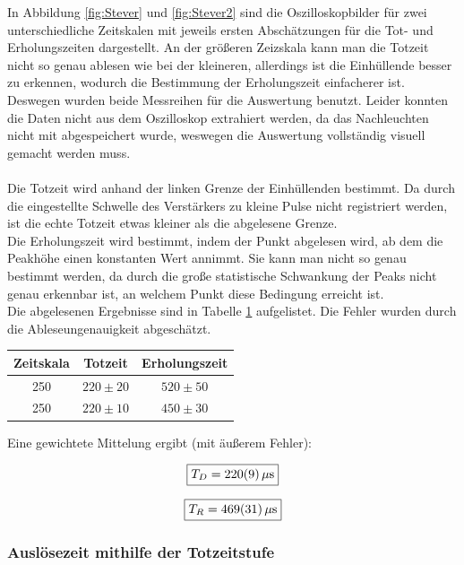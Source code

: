 \documentclass[12pt,a4paper]{article}
\begin{document}
In Abbildung \ref{fig:Stever} und \ref{fig:Stever2} sind die Oszilloskopbilder für zwei unterschiedliche Zeitskalen mit jeweils ersten Abschätzungen für die Tot- und Erholungszeiten dargestellt. An der größeren Zeizskala kann man die Totzeit nicht so genau ablesen wie bei der kleineren, allerdings ist die Einhüllende besser zu erkennen, wodurch die Bestimmung der Erholungszeit einfacherer ist. Deswegen wurden beide Messreihen für die Auswertung benutzt.
Leider konnten die Daten nicht aus dem Oszilloskop extrahiert werden, da das Nachleuchten nicht mit abgespeichert wurde, weswegen die Auswertung vollständig visuell gemacht werden muss.\\
\\
Die Totzeit wird anhand der linken Grenze der Einhüllenden bestimmt. Da durch die eingestellte Schwelle des Verstärkers zu kleine Pulse nicht registriert werden, ist die echte Totzeit etwas kleiner als die abgelesene Grenze.\\
Die Erholungszeit wird bestimmt, indem der Punkt abgelesen wird, ab dem die Peakhöhe einen konstanten Wert annimmt.
Sie kann man nicht so genau bestimmt werden, da durch die große statistische Schwankung der Peaks nicht genau erkennbar ist, an welchem Punkt diese Bedingung erreicht ist.\\
Die abgelesenen Ergebnisse sind in Tabelle \ref{teb:Stever} aufgelistet. Die Fehler wurden durch die Ableseungenauigkeit abgeschätzt.

\begin{table}
\centering
\begin{tabular}{|c|c|c|}
\hline
Zeitskala & Totzeit & Erholungszeit\\
\hline 
250 & $220\pm 20$ & $520\pm 50$ \\
\hline 
250 & $220\pm 10$ & $450\pm 30$ \\
\hline
\end{tabular}
\label{teb:Stever}
\end{table}

Eine gewichtete Mittelung ergibt (mit äußerem Fehler):

\begin{equation}
\boxed{T_D = \SI{220 \pm 9}{\mu s}}
\end{equation}

\begin{equation}
\boxed{T_R = \SI{469 \pm 31}{\mu s}}
\end{equation}

\subsubsection{Auslösezeit mithilfe der Totzeitstufe}
\end{document}
